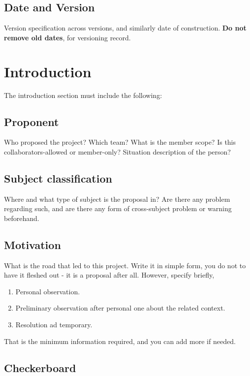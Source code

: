 \documentclass[10pt,a4paper]{article}
\begin{document}
\subsection{Date and Version}

Version specification across versions, and similarly date of construction. \textbf{Do not remove old dates}, for versioning record. 

\section{Introduction}
\label{sec:intro}

The introduction section must include the following:

\subsection{Proponent}

Who proposed the project? Which team? What is the member scope? Is this collaborators-allowed or member-only? Situation description of the person?

\subsection{Subject classification}

Where and what type of subject is the proposal in? Are there any problem regarding such, and are there any form of cross-subject problem or warning beforehand. 

\subsection{Motivation}

What is the road that led to this project. Write it in simple form, you do not to have it fleshed out - it is a proposal after all. However, specify briefly,

\begin{enumerate}
    \item Personal observation. 
    \item Preliminary observation after personal one about the related context. 
    \item Resolution ad temporary. 
\end{enumerate}

That is the minimum information required, and you can add more if needed. 

\subsection{Checkerboard}
\end{document}
